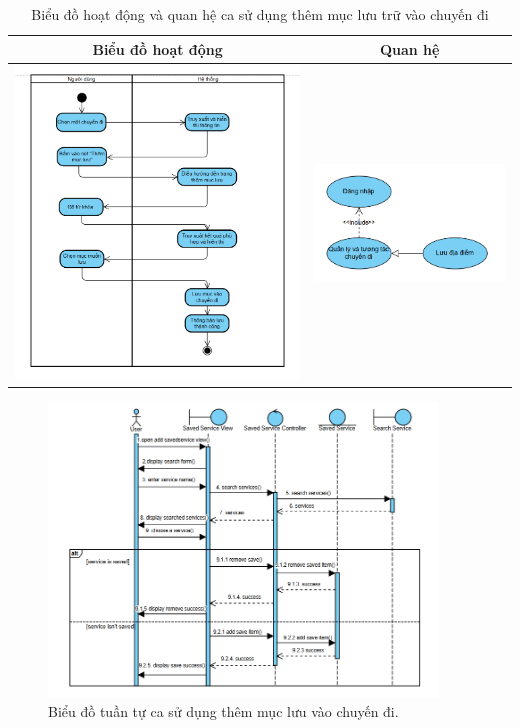 \begin{table}[H] %
    \centering
    \caption{Biểu đồ hoạt động và quan hệ ca sử dụng thêm mục lưu trữ vào chuyến đi} %
    \label{tab:uc_add_saved_item_diagrams} %
    \begin{tabular}{| c | c |}
        \hline
        \textbf{Biểu đồ hoạt động} & \textbf{Quan hệ} \\
        \hline
        \includegraphics[width=0.5\linewidth]{figures/c3/3-3-12-ad.png} %
        &
        \includegraphics[width=0.45\linewidth]{figures/c3/3-3-12-rd.png} \\ %
        \hline
    \end{tabular}
\end{table}

\begin{figure}[H]
    \centering
    \includegraphics[width=0.92\textwidth]{figures/c3/3-3-12-sd.png} %
    \caption{Biểu đồ tuần tự ca sử dụng thêm mục lưu vào chuyến đi.} %
    \label{fig:3-3-12-sequence-diagram}
\end{figure}